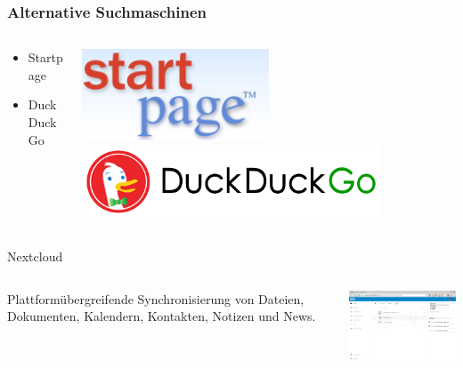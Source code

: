 \documentclass[12pt, table]{beamer}
\begin{document}
\begin{frame}
	\frametitle{Alternative Suchmaschinen}
	\begin{columns}
		\begin{column}{5cm}
			\begin{center}
				\begin{itemize}
					\item Startpage
					\vspace{2cm}
					\item DuckDuckGo
				\end{itemize}
			\end{center}
		\end{column}
		\begin{column}{5cm}
			\begin{center}
				\includegraphics[width=0.5\textwidth]{../img/startp_logo.png}
				\vspace{1cm}
				\includegraphics[width=0.8\textwidth]{../img/duckduckgo.png}
			\end{center}
		\end{column}
	\end{columns}
\end{frame}

\begin{frame}{Nextcloud}
	\begin{columns}
		\column{4cm}
		\footnotesize
		Plattformübergreifende Synchronisierung von Dateien, Dokumenten, Kalendern, Kontakten, Notizen und News.
		\column{6cm}
		\begin{center}
			\includegraphics[width=6cm]{../img/nextcloud.png}
			\par
		\end{center}
	\end{columns}
\end{frame}
\end{document}
